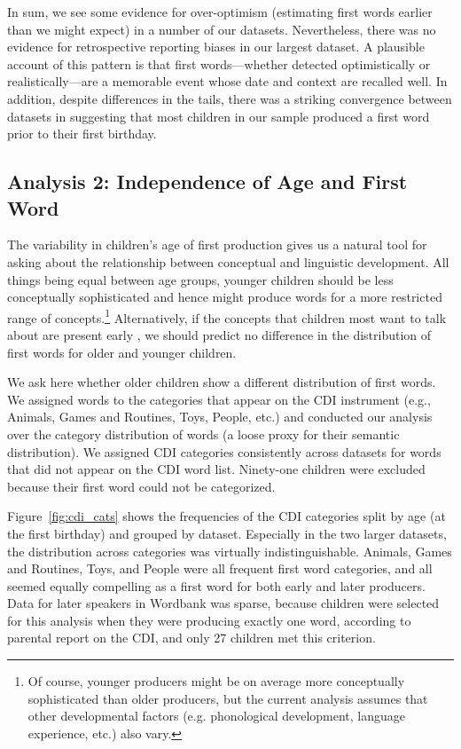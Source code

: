 \documentclass[10pt,letterpaper]{article}
\begin{document}
In sum, we see some evidence for over-optimism (estimating first words earlier than we might expect) in a number of our datasets. Nevertheless, there was no evidence for retrospective reporting biases in our largest dataset. A plausible account of this pattern is that first words---whether detected optimistically or realistically---are a memorable event whose date and context are recalled well. In addition, despite differences in the tails, there was a striking convergence between datasets in suggesting that most children in our sample produced a first word prior to their first birthday. 

\subsection{Analysis 2: Independence of Age and First Word}

The variability in children's age of first production gives us a natural tool for asking about the relationship between conceptual and linguistic development. All things being equal between age groups, younger children should be less conceptually sophisticated and hence might produce words for a more restricted range of concepts.\footnote{Of course, younger producers might be on average more conceptually sophisticated than older producers, but the current analysis assumes that other developmental factors (e.g. phonological development, language experience, etc.) also vary.} Alternatively, if the concepts that children most want to talk about are present early \cite{snedeker2007,snedeker2012,gleitman1990}, we should predict no difference in the distribution of first words for older and younger children. 

We ask here whether older children show a different distribution of first words.  We assigned words to the categories that appear on the CDI instrument (e.g., Animals, Games and Routines, Toys, People, etc.) and conducted our analysis over the category distribution of words (a loose proxy for their semantic distribution). We assigned CDI categories consistently across datasets for words that did not appear on the CDI word list. Ninety-one children were excluded because their first word could not be categorized. 

Figure~\ref{fig:cdi_cats} shows the frequencies of the CDI categories split by age (at the first birthday) and grouped by dataset. Especially in the two larger datasets, the distribution across categories was virtually indistinguishable. Animals, Games and Routines, Toys, and People were all frequent first word categories, and all seemed equally compelling as a first word for both early and later producers. Data for later speakers in Wordbank was sparse, because children were selected for this analysis when they were producing exactly one word, according to parental report on the CDI, and only 27 children met this criterion.
\end{document}
